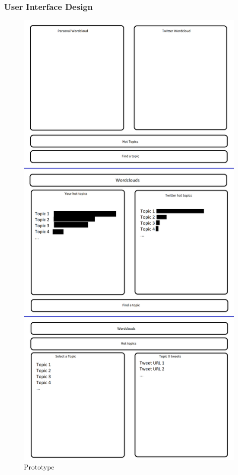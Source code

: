 \subsubsection{User Interface Design}
\begin{figure}[hbtp]
    \centering
    \includegraphics[height=0.7\textheight]{../images/design/prototype.png}
    \caption{Prototype}
    \label{fig:prototype}
\end{figure}
